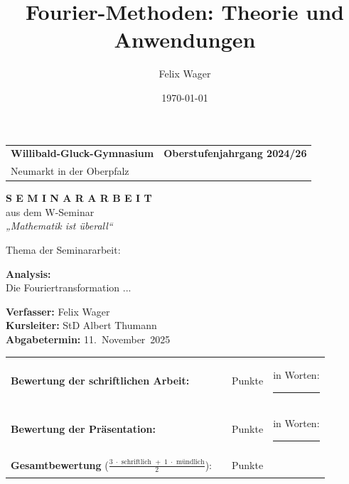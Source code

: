 \documentclass[a4paper,12pt]{article}
\title{Fourier-Methoden: Theorie und Anwendungen}
\author{Felix Wager}
\date{\today}
\theoremstyle{definition}
\theoremstyle{remark}
\begin{document}
\thispagestyle{empty}
\begin{center}

\vspace*{1cm}

\begin{tabular}{p{7cm}p{7cm}}
\textbf{Willibald-Gluck-Gymnasium} & \hfill \textbf{Oberstufenjahrgang 2024/26} \\
Neumarkt in der Oberpfalz & \\
\end{tabular}

\vspace{3cm}

\textbf{\Large S E M I N A R A R B E I T}\\[0.3cm]
aus dem W-Seminar\\[0.3cm]
\textit{„Mathematik ist überall“}

\vspace{2cm}
\begin{flushleft}
Thema der Seminararbeit:
\end{flushleft}
\begin{center}
\textbf{Analysis:}\\
Die Fouriertransformation ...
\end{center}

\vspace{2cm}

\begin{flushleft}
\textbf{Verfasser:} \hspace{2cm} Felix Wager\\[0.3cm]
\textbf{Kursleiter:} \hspace{2.5cm} StD Albert Thumann\\[0.3cm]
\textbf{Abgabetermin:} \hspace{1.6cm} 11.\ November\ 2025
\end{flushleft}

\vspace{2cm}

\begin{flushleft}
\begin{tabular}{@{}l l l l@{}}
\textbf{Bewertung der schriftlichen Arbeit:} & \rule{1cm}{0.4pt} & Punkte & in Worten: \rule{3cm}{0.4pt} \\[0.4cm]
\textbf{Bewertung der Präsentation:} & \rule{1cm}{0.4pt} & Punkte & in Worten: \rule{3cm}{0.4pt} \\[0.4cm]
\textbf{Gesamtbewertung} ($\frac{3 \; \cdot \text{ schriftlich } + \; 1 \; \cdot \text{ mündlich}}{2}$): & \rule{1cm}{0.4pt} & Punkte & \\
\end{tabular}


\end{flushleft}
\end{center}
\end{document}
